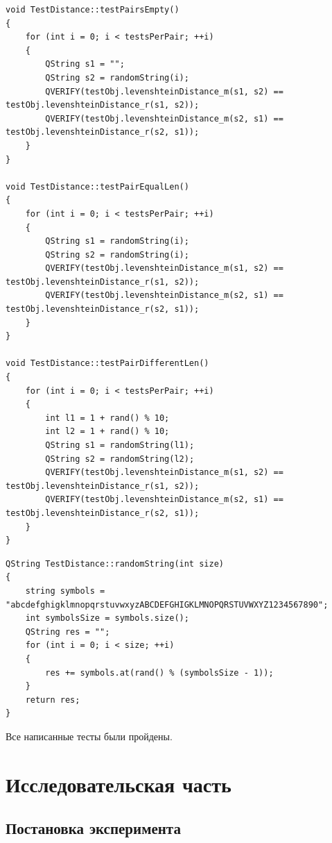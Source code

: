 \documentclass[14pt]{report}
\begin{document}
\begin{lstlisting}[label=some-code,caption=сравнение результатов работы двух алгоритмов ]
void TestDistance::testPairsEmpty()
{
    for (int i = 0; i < testsPerPair; ++i)
    {
        QString s1 = "";
        QString s2 = randomString(i);
        QVERIFY(testObj.levenshteinDistance_m(s1, s2) == testObj.levenshteinDistance_r(s1, s2));
        QVERIFY(testObj.levenshteinDistance_m(s2, s1) == testObj.levenshteinDistance_r(s2, s1));
    }
}

void TestDistance::testPairEqualLen()
{
    for (int i = 0; i < testsPerPair; ++i)
    {
        QString s1 = randomString(i);
        QString s2 = randomString(i);
        QVERIFY(testObj.levenshteinDistance_m(s1, s2) == testObj.levenshteinDistance_r(s1, s2));
        QVERIFY(testObj.levenshteinDistance_m(s2, s1) == testObj.levenshteinDistance_r(s2, s1));
    }
}

void TestDistance::testPairDifferentLen()
{
    for (int i = 0; i < testsPerPair; ++i)
    {
        int l1 = 1 + rand() % 10;
        int l2 = 1 + rand() % 10;
        QString s1 = randomString(l1);
        QString s2 = randomString(l2);
        QVERIFY(testObj.levenshteinDistance_m(s1, s2) == testObj.levenshteinDistance_r(s1, s2));
        QVERIFY(testObj.levenshteinDistance_m(s2, s1) == testObj.levenshteinDistance_r(s2, s1));
    }
}
\end{lstlisting}

\begin{lstlisting}[label=some-code,caption=Генератор случайных строк ]
QString TestDistance::randomString(int size)
{
    string symbols = "abcdefghigklmnopqrstuvwxyzABCDEFGHIGKLMNOPQRSTUVWXYZ1234567890";
    int symbolsSize = symbols.size();
    QString res = "";
    for (int i = 0; i < size; ++i)
    {
        res += symbols.at(rand() % (symbolsSize - 1));
    }
    return res;
}
\end{lstlisting}

Все написанные тесты были пройдены.

\chapter*{Исследовательская часть}

\section*{Постановка эксперимента}
\end{document}
